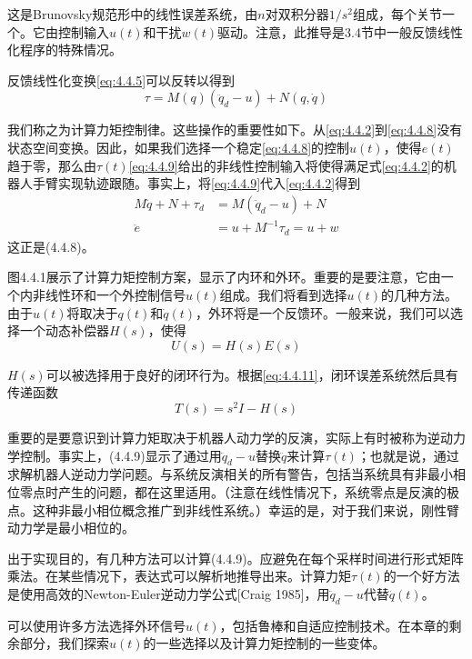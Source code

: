 \documentclass[UTF8]{ctexart}
\theoremstyle{definition}
\begin{document}
这是Brunovsky规范形中的线性误差系统，由$n$对双积分器$1/s^2$组成，每个关节一个。它由控制输入$u(t)$和干扰$w(t)$驱动。注意，此推导是3.4节中一般反馈线性化程序的特殊情况。

反馈线性化变换\eqref{eq:4.4.5}可以反转以得到
\begin{equation}\label{eq:4.4.9}
    \tau = M(q)(\ddot{q}_d - u) + N(q, \dot{q})
\end{equation}

我们称之为计算力矩控制律。这些操作的重要性如下。从\eqref{eq:4.4.2}到\eqref{eq:4.4.8}没有状态空间变换。因此，如果我们选择一个稳定\eqref{eq:4.4.8}的控制$u(t)$，使得$e(t)$趋于零，那么由$\tau(t)$\eqref{eq:4.4.9}给出的非线性控制输入将使得满足式\eqref{eq:4.4.2}的机器人手臂实现轨迹跟随。事实上，将\eqref{eq:4.4.9}代入\eqref{eq:4.4.2}得到
\begin{align}
    M\ddot{q} + N + \tau_d &= M(\ddot{q}_d - u) + N \label{eq:4.4.10}\\
    \ddot{e} &= u + M^{-1}\tau_d = u + w \label{eq:4.4.11}
\end{align}
这正是(4.4.8)。

图4.4.1展示了计算力矩控制方案，显示了内环和外环。重要的是要注意，它由一个内非线性环和一个外控制信号$u(t)$组成。我们将看到选择$u(t)$的几种方法。由于$u(t)$将取决于$q(t)$和$\dot{q}(t)$，外环将是一个反馈环。一般来说，我们可以选择一个动态补偿器$H(s)$，使得
\begin{equation}\label{eq:4.4.12}
    U(s) = H(s)E(s)
\end{equation}

$H(s)$可以被选择用于良好的闭环行为。根据\eqref{eq:4.4.11}，闭环误差系统然后具有传递函数
\begin{equation}\label{eq:4.4.13}
    T(s) = s^2I - H(s)
\end{equation}

重要的是要意识到计算力矩取决于机器人动力学的反演，实际上有时被称为逆动力学控制。事实上，(4.4.9)显示了通过用$\ddot{q}_d - u$替换$\ddot{q}$来计算$\tau(t)$；也就是说，通过求解机器人逆动力学问题。与系统反演相关的所有警告，包括当系统具有非最小相位零点时产生的问题，都在这里适用。（注意在线性情况下，系统零点是反演的极点。这种非最小相位概念推广到非线性系统。）幸运的是，对于我们来说，刚性臂动力学是最小相位的。

出于实现目的，有几种方法可以计算(4.4.9)。应避免在每个采样时间进行形式矩阵乘法。在某些情况下，表达式可以解析地推导出来。计算力矩$\tau(t)$的一个好方法是使用高效的Newton-Euler逆动力学公式[Craig 1985]，用$\ddot{q}_d - u$代替$\ddot{q}(t)$。

可以使用许多方法选择外环信号$u(t)$，包括鲁棒和自适应控制技术。在本章的剩余部分，我们探索$u(t)$的一些选择以及计算力矩控制的一些变体。
\end{document}
